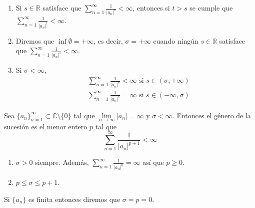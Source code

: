 \begin{remark}
    \hfill
    \begin{enumerate}
        \item Si $s \in \mathbb{R}$ satisface que $\sum_{n=1}^\infty \frac{1}{|a_n|^s} < \infty$, entonces si $t > s$ se cumple que $\sum_{n=1}^\infty \frac{1}{|a_n|^t} < \infty$.
        \item Diremos que $\inf\emptyset = +\infty$, es decir, $\sigma = +\infty$ cuando ningún $s \in \mathbb{R}$ satisface que $\sum_{n=1}^\infty \frac{1}{|a_n|^s} < \infty$.
        \item Si $\sigma < \infty$,
              \begin{align*}
                   & \sum_{n=1}^\infty \frac{1}{|a_n|^s} < \infty \text{ si } s \in (\sigma, +\infty) \\
                   & \sum_{n=1}^\infty \frac{1}{|a_n|^s} = \infty \text{ si } s \in (-\infty, \sigma)
              \end{align*}
    \end{enumerate}
\end{remark}

\begin{definition}
    Sea $\{a_n\}_{n=1}^\infty \subset \mathbb{C} \setminus \{0\}$ tal que $\lim\limits_{n \to \infty} |a_n| = \infty$ y $\sigma < \infty$.
    Entonces el género de la sucesión es el menor entero $p$ tal que
    $$\sum_{n=1}^\infty \frac{1}{|a_n|^{p+1}} < \infty$$
\end{definition}

\begin{remark}
    \hfill
    \begin{enumerate}
        \item $\sigma > 0$ siempre.
              Además, $\sum_{n=1}^\infty \frac{1}{|a_n|^0} = \infty$ así que $p \geq 0$.
        \item $p \leq \sigma \leq p+1$.
    \end{enumerate}
\end{remark}

Si $\{a_n\}$ es finita entonces diremos que $\sigma = p = 0$.

